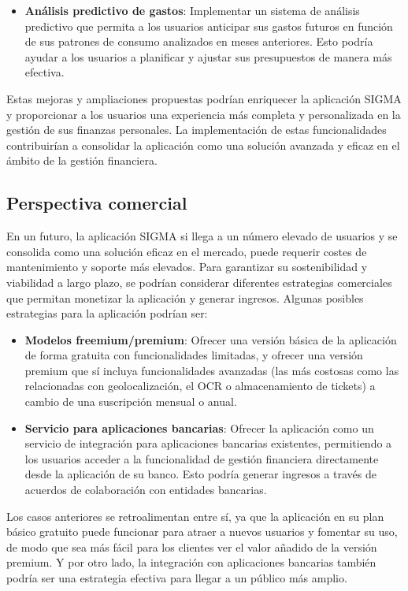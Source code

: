 \begin{itemize}
    \item \textbf{Análisis predictivo de gastos}: Implementar un sistema de análisis predictivo que permita a los usuarios anticipar sus gastos futuros en función de sus patrones de consumo analizados en meses anteriores. Esto podría ayudar a los usuarios a planificar y ajustar sus presupuestos de manera más efectiva.
\end{itemize}

Estas mejoras y ampliaciones propuestas podrían enriquecer la aplicación SIGMA y proporcionar a los usuarios una experiencia más completa y personalizada en la gestión de sus finanzas personales. La implementación de estas funcionalidades contribuirían a consolidar la aplicación como una solución avanzada y eficaz en el ámbito de la gestión financiera.


\subsection{Perspectiva comercial}
En un futuro, la aplicación SIGMA si llega a un número elevado de usuarios y se consolida como una solución eficaz en el mercado, puede requerir costes de mantenimiento y soporte más elevados. Para garantizar su sostenibilidad y viabilidad a largo plazo, se podrían considerar diferentes estrategias comerciales que permitan monetizar la aplicación y generar ingresos. Algunas posibles estrategias para la aplicación podrían ser:

\begin{itemize}
    \item \textbf{Modelos freemium/premium}: Ofrecer una versión básica de la aplicación de forma gratuita con funcionalidades limitadas, y ofrecer una versión premium que sí incluya funcionalidades avanzadas (las más costosas como las relacionadas con geolocalización, el OCR o almacenamiento de tickets) a cambio de una suscripción mensual o anual.
    \item \textbf{Servicio para aplicaciones bancarias}: Ofrecer la aplicación como un servicio de integración para aplicaciones bancarias existentes, permitiendo a los usuarios acceder a la funcionalidad de gestión financiera directamente desde la aplicación de su banco. Esto podría generar ingresos a través de acuerdos de colaboración con entidades bancarias.
\end{itemize}

Los casos anteriores se retroalimentan entre sí, ya que la aplicación en su plan básico gratuito puede funcionar para atraer a nuevos usuarios y fomentar su uso, de modo que sea más fácil para los clientes ver el valor añadido de la versión premium. Y por otro lado, la integración con aplicaciones bancarias también podría ser una estrategia efectiva para llegar a un público más amplio.

